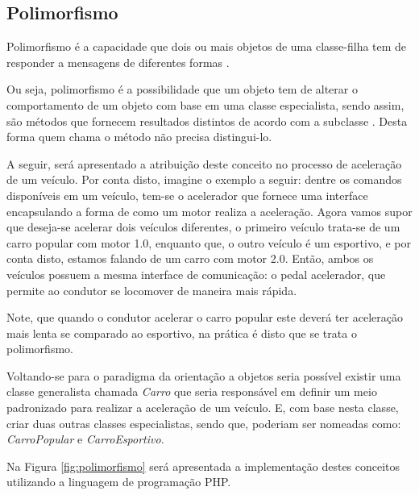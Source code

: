 \subsection{Polimorfismo}

Polimorfismo é a capacidade que dois ou mais objetos de uma classe-filha tem  de
responder a mensagens de diferentes formas
\cite{php5ConceitosProgramacaoEIntegracaoComBancoDeDados}.

Ou seja, polimorfismo é a possibilidade que um objeto tem de alterar o
comportamento de um objeto com base em uma classe especialista, sendo assim,
são métodos que fornecem resultados distintos  de acordo com a subclasse
\cite{php5ConceitosProgramacaoEIntegracaoComBancoDeDados}. Desta forma quem
chama o método não precisa distingui-lo.

A seguir, será apresentado a atribuição deste conceito no processo de aceleração
de um veículo. Por conta disto, imagine o exemplo a seguir: dentre os comandos
disponíveis em um veículo, tem-se o acelerador que fornece uma interface
encapsulando a forma de como um motor realiza a aceleração. Agora vamos
supor que deseja-se acelerar dois veículos diferentes, o primeiro veículo
trata-se de um carro popular com motor 1.0, enquanto que, o outro veículo é um
 esportivo, e por conta disto, estamos falando de um carro com motor 2.0. Então,
ambos os veículos possuem a mesma interface de comunicação: o pedal acelerador,
que permite ao condutor se locomover de maneira mais rápida. 

Note, que quando o condutor acelerar o carro popular este deverá ter aceleração
mais lenta se comparado ao esportivo, na prática é disto que se trata o polimorfismo.

Voltando-se para o paradigma da orientação a objetos seria possível existir uma
classe generalista chamada \textit{Carro} que seria responsável em definir um
meio padronizado para realizar a aceleração de um veículo. E, com base nesta
classe, criar duas outras classes especialistas, sendo que, poderiam ser
nomeadas como: \textit{CarroPopular} e \textit{CarroEsportivo}.

Na Figura \ref{fig:polimorfismo} será apresentada a implementação destes conceitos
utilizando a linguagem de programação \acs{PHP}.

